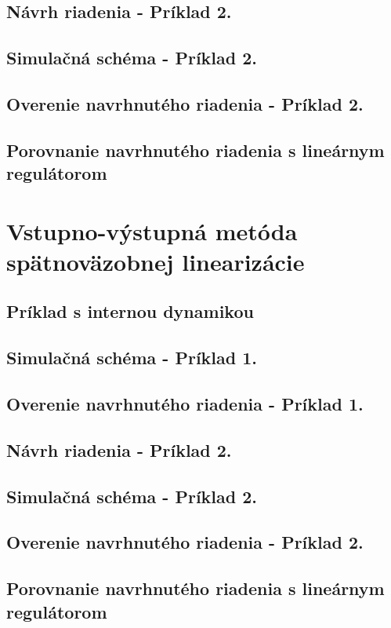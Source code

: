 \subsection{Návrh riadenia - Príklad 2.}
\subsection{Simulačná schéma - Príklad 2.}
\subsection{Overenie navrhnutého riadenia - Príklad 2.}
\subsection{Porovnanie navrhnutého riadenia s lineárnym regulátorom}

\newpage
\section{Vstupno-výstupná metóda spätnoväzobnej linearizácie}
	

\subsection{Príklad s internou dynamikou}


\subsection{Simulačná schéma - Príklad 1.}
\subsection{Overenie navrhnutého riadenia - Príklad 1.}
\subsection{Návrh riadenia - Príklad 2.}
\subsection{Simulačná schéma - Príklad 2.}
\subsection{Overenie navrhnutého riadenia - Príklad 2.}
\subsection{Porovnanie navrhnutého riadenia s lineárnym regulátorom}



